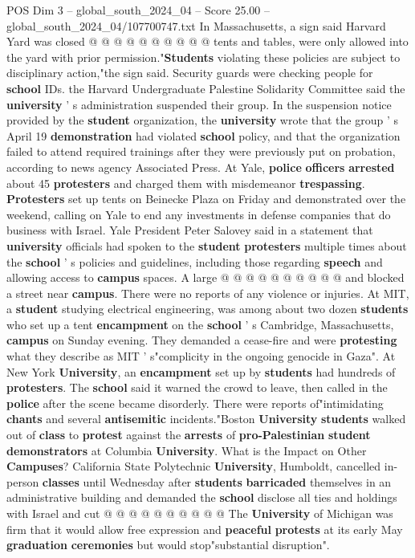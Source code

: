 \begin{textsample}{POS Dim 3 – global\_south\_2024\_04 – Score 25.00 – global\_south\_2024\_04/107700747.txt}
In Massachusetts, a sign said Harvard Yard was closed @ @ @ @ @ @ @ @ @ @ tents and tables, were only allowed into the yard with prior permission."\textbf{Students} violating these policies are subject to disciplinary action,"the sign said.
Security guards were checking people for \textbf{school} IDs. the Harvard Undergraduate Palestine Solidarity Committee said the \textbf{university} ' s administration suspended their group.
In the suspension notice provided by the \textbf{student} organization, the \textbf{university} wrote that the group ' s April 19 \textbf{demonstration} had violated \textbf{school} policy, and that the organization failed to attend required trainings after they were previously put on probation, according to news agency Associated Press.
At Yale, \textbf{police} \textbf{officers} \textbf{arrested} about 45 \textbf{protesters} and charged them with misdemeanor \textbf{trespassing}. \textbf{Protesters} set up tents on Beinecke Plaza on Friday and demonstrated over the weekend, calling on Yale to end any investments in defense companies that do business with Israel.
Yale President Peter Salovey said in a statement that \textbf{university} officials had spoken to the \textbf{student} \textbf{protesters} multiple times about the \textbf{school} ' s policies and guidelines, including those regarding \textbf{speech} and allowing access to \textbf{campus} spaces.
A large @ @ @ @ @ @ @ @ @ @ and blocked a street near \textbf{campus}.
There were no reports of any violence or injuries.
At MIT, a \textbf{student} studying electrical engineering, was among about two dozen \textbf{students} who set up a tent \textbf{encampment} on the \textbf{school} ' s Cambridge, Massachusetts, \textbf{campus} on Sunday evening.
They demanded a cease-fire and were \textbf{protesting} what they describe as MIT ' s"complicity in the ongoing genocide in Gaza".
At New York \textbf{University}, an \textbf{encampment} set up by \textbf{students} had hundreds of \textbf{protesters}.
The \textbf{school} said it warned the crowd to leave, then called in the \textbf{police} after the scene became disorderly.
There were reports of"intimidating \textbf{chants} and several \textbf{antisemitic} incidents."Boston \textbf{University} \textbf{students} walked out of \textbf{class} to \textbf{protest} against the \textbf{arrests} of \textbf{pro-Palestinian} \textbf{student} \textbf{demonstrators} at Columbia \textbf{University}.
What is the Impact on Other \textbf{Campuses}?
California State Polytechnic \textbf{University}, Humboldt, cancelled in-person \textbf{classes} until Wednesday after \textbf{students} \textbf{barricaded} themselves in an administrative building and demanded the \textbf{school} disclose all ties and holdings with Israel and cut @ @ @ @ @ @ @ @ @ @ The \textbf{University} of Michigan was firm that it would allow free expression and \textbf{peaceful} \textbf{protests} at its early May \textbf{graduation} \textbf{ceremonies} but would stop"substantial disruption".

\end{textsample}
